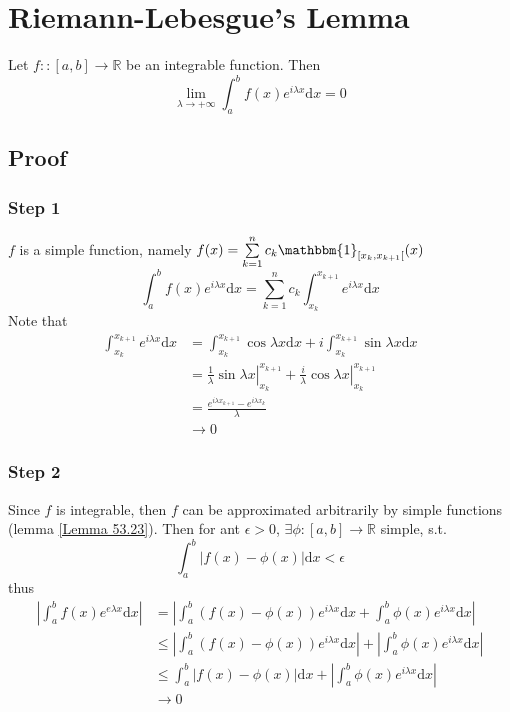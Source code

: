 \documentclass{book}
\newcommand{\abs}[1]{\left\lvert #1 \right\rvert}
\newcommand{\leftbracket}{[}
\begin{document}
\section{Riemann-Lebesgue's Lemma}
\label{Riemann-Lebesgue's Lemma}
Let $f::[a,b]\rightarrow\mathbb{R}$ be an integrable function. Then $$\lim\limits_{\lambda\rightarrow+\infty}\int_a^bf(x)e^{i\lambda x}\text{d}x=0$$
\subsection*{Proof}
\subsubsection{Step 1}
$f$ is a simple function, namely $f(x)=\sum\limits_{k=1}^nc_k\mathbbm{1}_{\leftbracket x_k,x_{k+1}\leftbracket}(x)$
$$\int_a^bf(x)e^{i\lambda x}\text{d}x=\sum\limits_{k=1}^nc_k\int_{x_k}^{x_{k+1}}e^{i\lambda x}\text{d}x$$
Note that 
$$\begin{aligned}
    \int_{x_k}^{x_{k+1}}e^{i\lambda x}\text{d}x&=\int_{x_k}^{x_{k+1}}\cos\lambda x\text{d}x+i\int_{x_k}^{x_{k+1}}\sin\lambda x\text{d}x\\
    &=\left.\frac{1}{\lambda}\sin\lambda x\right|_{x_k}^{x_{k+1}}+\left.\frac{i}{\lambda}\cos\lambda x\right|_{x_k}^{x_{k+1}}\\
    &=\frac{e^{i\lambda x_{k+1}}-e^{i\lambda x_k}}{\lambda}\\
    &\rightarrow 0
\end{aligned}$$
\subsubsection{Step 2}
Since $f$ is integrable, then $f$ can be approximated arbitrarily by simple functions (lemma \ref{Lemma 53.23}). Then for ant $\epsilon>0$, $\exists\phi:[a,b]\rightarrow\mathbb{R}$ simple, s.t.
$$\int_a^b\abs{f(x)-\phi(x)}\text{d}x<\epsilon$$
thus
$$\begin{aligned}
    \abs{\int_a^b f(x)e^{e\lambda x}\text{d}x} &=\abs{\int_a^b(f(x)-\phi(x))e^{i\lambda x}\text{d}x+\int_a^b\phi(x)e^{i\lambda x}\text{d}x}\\
    &\leq\abs{\int_a^b(f(x)-\phi(x))e^{i\lambda x}\text{d}x}+\abs{\int_a^b\phi(x)e^{i\lambda x}\text{d}x}\\
    &\leq\int_a^b\abs{f(x)-\phi(x)}\text{d}x+\abs{\int_a^b\phi(x)e^{i\lambda x}\text{d}x}\\
    &\rightarrow 0
\end{aligned}$$
\end{document}
